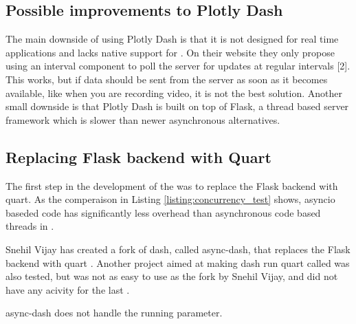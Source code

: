 \subsection{Possible improvements to Plotly Dash}
The main downside of using Plotly Dash is that it is not designed for real time
applications and lacks native support for . On their website they only propose
using an interval component to poll the server for updates at regular intervals
    [2]. This works, but if data should be sent from the server as soon as it becomes
available, like when you are recording video, it is not the best solution.
Another small downside is that Plotly Dash is built on top of Flask, a thread
based server framework which is slower than newer asynchronous alternatives.

\subsection{Replacing Flask backend with Quart}
The first step in the development of the \guif was to replace the Flask backend with \gls{quart}.
As the comperaison in Listing \ref{listing:concurrency_test} shows, \gls{asyncio} baseded code has significantly less overhead than asynchronous code based threads in \py.


Snehil Vijay has created a fork of \gls{dash}, called \gls{async-dash}, that replaces the Flask backend with \gls{quart} \cite{vijaySnehilvjAsyncdash2023}.
Another project aimed at making \gls{dash} run \gls{quart} called  was also tested, but was not as easy to use as the fork by Snehil Vijay, and did not have any acivity for the last  \cite{legrandCodeFrequencyRichlegrand}.

\todo \gls{async-dash} does not handle the running parameter.

